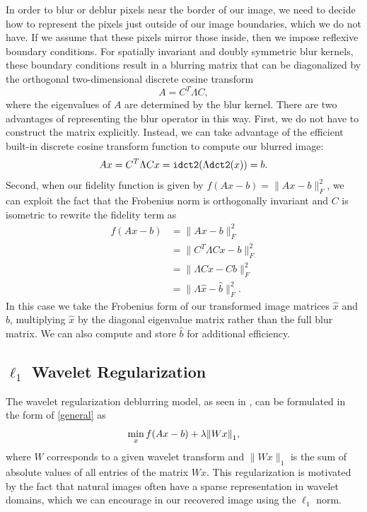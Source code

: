 \documentclass[10pt,a4paper]{article}
\begin{document}
In order to blur or deblur pixels near the border of our image, we need to decide how to represent the pixels just outside of our image boundaries, which we do not have. If we assume that these pixels mirror those inside, then we impose reflexive boundary conditions. For spatially invariant and doubly symmetric blur kernels, these boundary conditions result in a blurring matrix that can be diagonalized by the orthogonal two-dimensional discrete cosine transform
\begin{equation}
A = C^T \Lambda C,
\end{equation}
where the eigenvalues of $A$ are determined by the blur kernel. There are two advantages of representing the blur operator in this way. First, we do not have to construct the matrix explicitly. Instead, we can take advantage of the efficient built-in discrete cosine transform function to compute our blurred image:
\begin{equation}
Ax = C^T \Lambda C x = {\tt idct2}( \Lambda {\tt dct2}(x)) = b.
\end{equation}
Second, when our fidelity function is given by $f(Ax -b) = \| Ax - b \|_F^2$, we can exploit the fact that the Frobenius norm is orthogonally invariant and $C$ is isometric to rewrite the fidelity term as
\begin{align*}
f(Ax - b) &= \| Ax - b \|_F^2 \\
&= \| C^T \Lambda C x - b \|_F^2 \\
&= \| \Lambda Cx - Cb \|_F^2 \\
&= \| \Lambda \hat{x} - \hat{b} \|_F^2.
\end{align*}
In this case we take the Frobenius form of our transformed image matrices $\hat x$ and $\hat b$, multiplying $\hat x$ by the diagonal eigenvalue matrix rather than the full blur matrix. We can also compute and store $\hat b$ for additional efficiency. 

\subsection{$\ell_1$ Wavelet Regularization}

The wavelet regularization deblurring model, as seen in \cite{FISTA}, can be formulated in the form of \eqref{general} as 
\begin{equation} \label{wavelet_orig}
\min_{x} f(Ax-b) + \lambda \norm{Wx}_1 ,
\end{equation}
where $W$ corresponds to a given wavelet transform and $\|Wx\|_1$ is the sum of absolute values of all entries of the matrix $Wx$. This regularization is motivated by the fact that natural images often have a sparse representation in wavelet domains, which we can encourage in our recovered image using the $\ell_1$ norm. 
\end{document}
